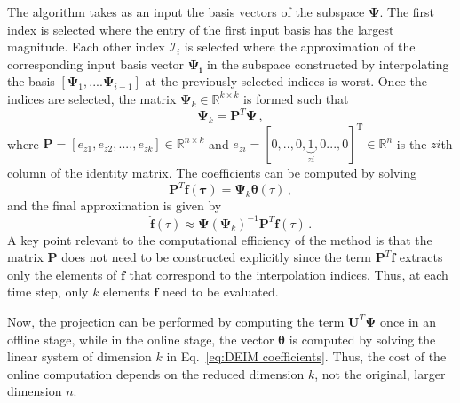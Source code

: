 \documentclass[]{interact}
\theoremstyle{plain}%
\theoremstyle{definition}
\theoremstyle{remark}
\begin{document}
The algorithm takes as an input the basis vectors of the subspace $\mathbf{\Psi}$.
The first index is selected where the entry of the first input basis has the largest magnitude.
Each other index $\mathcal{I}_i$ is selected where the approximation of the corresponding input basis vector $\mathbf{\Psi_i}$ in the subspace constructed by interpolating the basis $[\mathbf{\Psi}_1, ....\mathbf{\Psi}_{i-1}]$ at the previously selected indices is worst.
Once the indices are selected, the matrix $\mathbf{\Psi}_k \in \mathbb{R}^{k\times k}$ is formed such that
\begin{equation}
	\mathbf{\Psi}_k = \mathbf{P}^T\mathbf{\Psi}\, ,
\end{equation}
where $\mathbf{P} = [e_{z1}, e_{z2}, ....,e_{zk}] \in \mathbb{R}^{n\times k}$ and $e_{zi} = [0,.., 0, \underbrace{1}_{{zi}}, 0..., 0]^\text{T} \in \mathbb{R}^{n}$
is the  ${zi}$th column of the identity matrix.
The coefficients can be computed by solving
\begin{equation}
	\mathbf{P}^T\mathbf{f(\tau)}=\mathbf{\Psi}_k \boldsymbol{\theta}(\tau)\, ,
	\label{eq:DEIM coefficients}
\end{equation}
and the final approximation is given by
\begin{equation}
	\hat{\mathbf{f}}(\tau)\approx\mathbf{\Psi}( \mathbf{\Psi}_k)^{-1}\mathbf{P}^T\mathbf{f} (\tau)\, .
\end{equation}
A key point relevant to the computational efficiency of the method is that the matrix $\mathbf{P}$ does not need to be constructed explicitly since the term $\mathbf{P}^T\mathbf{f}$ extracts only the elements of $\mathbf{f}$ that correspond to the interpolation indices.
Thus, at each time step, only $k$ elements $\mathbf{f}$ need to be evaluated.

Now, the projection can be performed by computing the term $\mathbf{U}^T \mathbf{\Psi}$ once in an offline stage, while in the online stage, the vector $\boldsymbol{\theta}$ is computed by solving the linear system of dimension $k$ in Eq.~\ref{eq:DEIM coefficients}.
Thus, the cost of the online computation depends on the reduced dimension $k$, not the original, larger dimension $n$.
\end{document}
